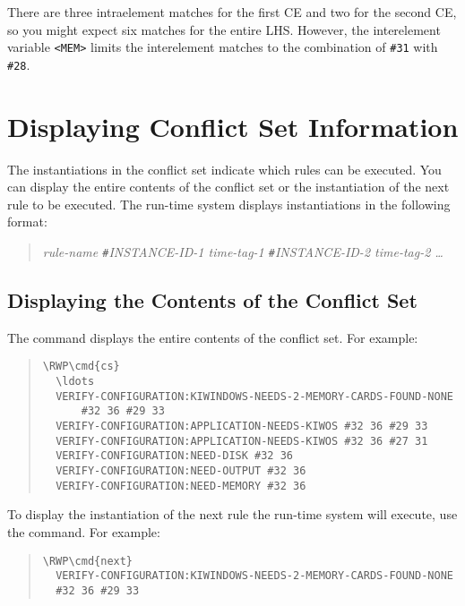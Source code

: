 There are three intraelement matches for the first CE and two for the
second CE, so you might expect six matches for the entire
LHS. However, the interelement variable \verb|<MEM>| limits the
interelement matches to the combination of  \verb|#31| with
 \verb|#28|.

\section{Displaying Conflict Set Information}

The instantiations in the conflict set indicate which rules can be
executed. You can display the entire contents of the conflict set or
the instantiation of the next rule to be executed. The run-time system
displays instantiations in the following format:

\begin{quote}
  \it{rule-name} \verb|#|\it{INSTANCE-ID-1} \it{time-tag-1}
  \verb|#|\it{INSTANCE-ID-2} \it{time-tag-2} \ldots
\end{quote}

\subsection{Displaying the Contents of the Conflict Set}

The  command displays the entire contents of the conflict set.
For example:

\begin{quote}
\begin{Verbatim}[commandchars=\\\{\}]
\RWP\cmd{cs}
  \ldots
  VERIFY-CONFIGURATION:KIWINDOWS-NEEDS-2-MEMORY-CARDS-FOUND-NONE
      #32 36 #29 33
  VERIFY-CONFIGURATION:APPLICATION-NEEDS-KIWOS #32 36 #29 33
  VERIFY-CONFIGURATION:APPLICATION-NEEDS-KIWOS #32 36 #27 31
  VERIFY-CONFIGURATION:NEED-DISK #32 36
  VERIFY-CONFIGURATION:NEED-OUTPUT #32 36
  VERIFY-CONFIGURATION:NEED-MEMORY #32 36
\end{Verbatim}
\end{quote}

To display the instantiation of the next rule the run-time
system will execute, use the  command. For example:

\begin{quote}
\begin{Verbatim}[commandchars=\\\{\}]
\RWP\cmd{next}
  VERIFY-CONFIGURATION:KIWINDOWS-NEEDS-2-MEMORY-CARDS-FOUND-NONE
  #32 36 #29 33
\end{Verbatim}
\end{quote}

